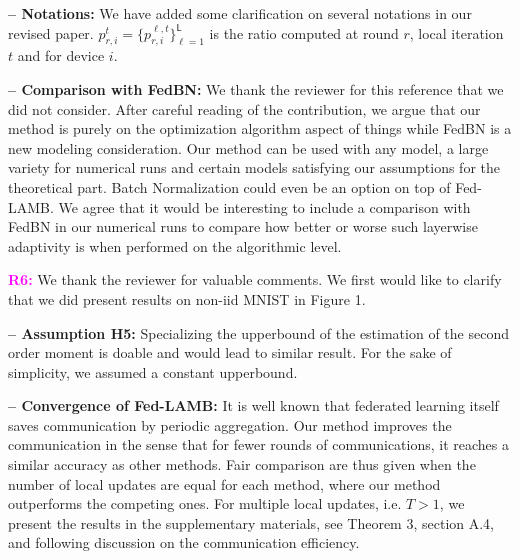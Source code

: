 \documentclass{article}
\begin{document}
\textbf{-- Notations:} We have added some clarification on several notations in our revised paper. 
$p_{r,i}^{t} = \{p_{r,i}^{\ell,t}\}_{\ell=1}^{\mathsf{L}}$ is the ratio computed at round $r$, local iteration $t$ and for device $i$.

\vspace{-0.5pt}
\textbf{-- Comparison with FedBN:} We thank the reviewer for this reference that we did not consider.
After careful reading of the contribution, we argue that our method is purely on the optimization algorithm aspect of things while FedBN is a new modeling consideration.
Our method can be used with any model, a large variety for numerical runs and certain models satisfying our assumptions for the theoretical part. 
Batch Normalization could even be an option on top of Fed-LAMB.
We agree that it would be interesting to include a comparison with FedBN in our numerical runs to compare how better or worse such layerwise adaptivity is when performed on the algorithmic level.

 \vspace{1pt}
\textbf{\textcolor{magenta}{R6:}} We thank the reviewer for valuable comments. We first would like to clarify that we did present results on non-iid MNIST in Figure 1.
\vspace{-1pt}

\textbf{-- Assumption H5:} Specializing the upperbound of the estimation of the second order moment is doable and would lead to similar result. For the sake of simplicity, we assumed a constant upperbound.

\vspace{-0.5pt}
\textbf{-- Convergence of Fed-LAMB:} It is well known that federated learning itself saves communication by periodic aggregation. Our method improves the communication in the sense that for fewer rounds of communications, it reaches a similar accuracy as other methods.
Fair comparison are thus given when the number of local updates are equal for each method, where our method outperforms the competing ones. For multiple local updates, i.e. $T > 1$, we present the results in the supplementary materials, see Theorem 3, section A.4, and following discussion on the communication efficiency.
\end{document}
